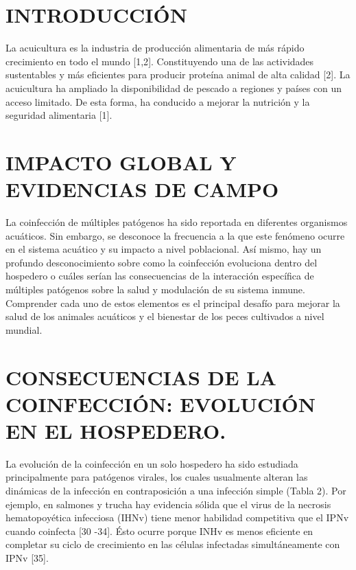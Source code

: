 \documentclass[]{elsarticle} %
\begin{document}
\hypertarget{introducciuxf3n}{%
\section{INTRODUCCIÓN}\label{introducciuxf3n}}

La acuicultura es la industria de producción alimentaria de más rápido crecimiento en todo el mundo {[}1,2{]}. Constituyendo una de las actividades sustentables y más eficientes para producir proteína animal de alta calidad {[}2{]}. La acuicultura ha ampliado la disponibilidad de pescado a regiones y países con un acceso limitado. De esta forma, ha conducido a mejorar la nutrición y la seguridad alimentaria {[}1{]}.

\hypertarget{impacto-global-y-evidencias-de-campo}{%
\section{IMPACTO GLOBAL Y EVIDENCIAS DE CAMPO}\label{impacto-global-y-evidencias-de-campo}}

La coinfección de múltiples patógenos ha sido reportada en diferentes organismos acuáticos. Sin embargo, se desconoce la frecuencia a la que este fenómeno ocurre en el sistema acuático y su impacto a nivel poblacional. Así mismo, hay un profundo desconocimiento sobre como la coinfección evoluciona dentro del hospedero o cuáles serían las consecuencias de la interacción específica de múltiples patógenos sobre la salud y modulación de su sistema inmune. Comprender cada uno de estos elementos es el principal desafío para mejorar la salud de los animales acuáticos y el bienestar de los peces cultivados a nivel mundial.

\hypertarget{consecuencias-de-la-coinfecciuxf3n-evoluciuxf3n-en-el-hospedero.}{%
\section{CONSECUENCIAS DE LA COINFECCIÓN: EVOLUCIÓN EN EL HOSPEDERO.}\label{consecuencias-de-la-coinfecciuxf3n-evoluciuxf3n-en-el-hospedero.}}

La evolución de la coinfección en un solo hospedero ha sido estudiada principalmente para patógenos virales, los cuales usualmente alteran las dinámicas de la infección en contraposición a una infección simple (Tabla 2). Por ejemplo, en salmones y trucha hay evidencia sólida que el virus de la necrosis hematopoyética infecciosa (IHNv) tiene menor habilidad competitiva que el IPNv cuando coinfecta {[}30 -34{]}. Ésto ocurre porque INHv es menos eficiente en completar su ciclo de crecimiento en las células infectadas simultáneamente con IPNv {[}35{]}.
\end{document}
